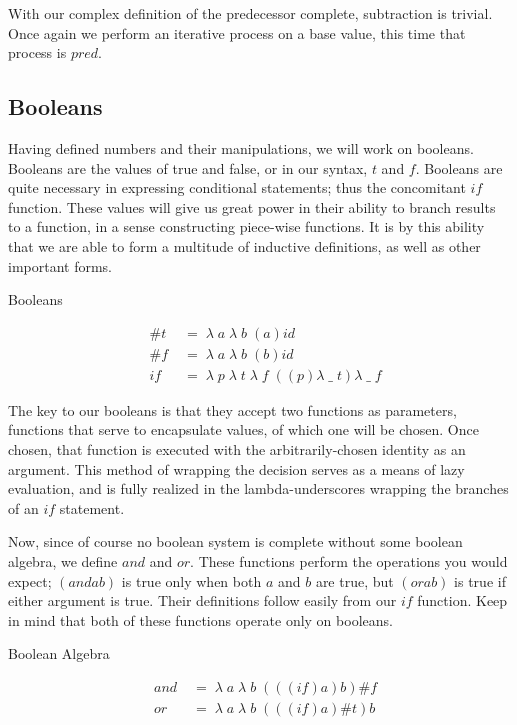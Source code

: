 With our complex definition of the predecessor complete, subtraction is trivial.
Once again we perform an iterative process on a base value, this time that process 
is $pred$.

\subsection{Booleans}
Having defined numbers and their manipulations, we will work on booleans. Booleans 
are the values of true and false, or in our syntax, $t$ and $f$. Booleans are
quite necessary in expressing conditional statements; thus the concomitant $if$
function. These values will give us great power in their ability to branch results 
to a function, in a sense constructing piece-wise functions. It is by this ability 
that we are able to form a multitude of inductive definitions, as well as other 
important forms.

Booleans
\begin{figure}[htp]
\caption{}\label{scheme}
\begin{align*}
& \#t \; &= \; \lambda \; a \; \lambda \; b \; (a)id
\\& \#f \; &= \; \lambda \; a \; \lambda \; b \; (b)id
\\& if \; &= \; \lambda \; p \; \lambda \; t \; \lambda \; f \; ((p)\lambda \; \_ \; t)\lambda \; \_ \; f
\end{align*}
\end{figure}

The key to our booleans is that they accept two functions as parameters, functions 
that serve to encapsulate values, of which one will be chosen. Once chosen, that 
function is executed with the arbitrarily-chosen identity as an argument. This
method of wrapping the decision serves as a means of lazy evaluation, and is fully 
realized in the lambda-underscores wrapping the branches of an $if$ statement.

Now, since of course no boolean system is complete without some boolean algebra, 
we define $and$ and $or$. These functions perform the operations you would expect; 
$(and a b)$ is true only when both $a$ and $b$ are true, but $(or a b)$ is true if 
either argument is true. Their definitions follow easily from our $if$ function. 
Keep in mind that both of these functions operate only on booleans.

Boolean Algebra
\begin{figure}[htp]
\caption{}\label{scheme}
\begin{align*}
& and \; &= \; \lambda \; a \; \lambda \; b \; (((if)a)b)\#f
\\& or \; &= \; \lambda \; a \; \lambda \; b \; (((if)a)\#t)b
\end{align*}
\end{figure}

